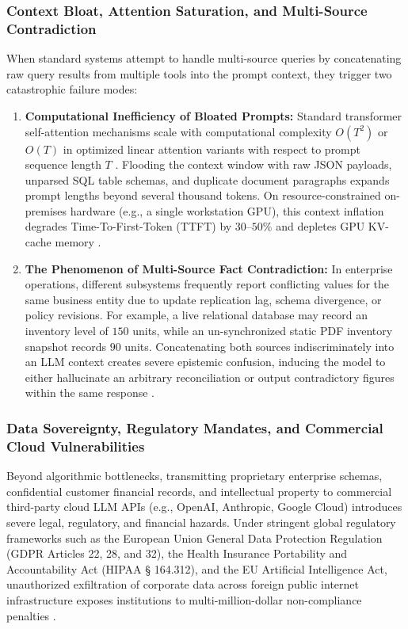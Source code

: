 \documentclass[journal,10pt,twocolumn]{IEEEtran}
\begin{document}
\subsubsection{Context Bloat, Attention Saturation, and Multi-Source Contradiction}
When standard systems attempt to handle multi-source queries by concatenating raw query results from multiple tools into the prompt context, they trigger two catastrophic failure modes:
\begin{enumerate}
    \item \textbf{Computational Inefficiency of Bloated Prompts:} Standard transformer self-attention mechanisms scale with computational complexity $O(T^2)$ or $O(T)$ in optimized linear attention variants with respect to prompt sequence length $T$ \cite{vaswani2017attention,dao2022flashattention}. Flooding the context window with raw JSON payloads, unparsed SQL table schemas, and duplicate document paragraphs expands prompt lengths beyond several thousand tokens. On resource-constrained on-premises hardware (e.g., a single workstation GPU), this context inflation degrades Time-To-First-Token (TTFT) by $30\text{--}50\%$ and depletes GPU KV-cache memory \cite{liu2024lost_in_the_middle}.
    \item \textbf{The Phenomenon of Multi-Source Fact Contradiction:} In enterprise operations, different subsystems frequently report conflicting values for the same business entity due to update replication lag, schema divergence, or policy revisions. For example, a live relational database may record an inventory level of $150$ units, while an un-synchronized static PDF inventory snapshot records $90$ units. Concatenating both sources indiscriminately into an LLM context creates severe epistemic confusion, inducing the model to either hallucinate an arbitrary reconciliation or output contradictory figures within the same response \cite{chen2023frugalgpt,min2023factscore}.
\end{enumerate}

\subsubsection{Data Sovereignty, Regulatory Mandates, and Commercial Cloud Vulnerabilities}
Beyond algorithmic bottlenecks, transmitting proprietary enterprise schemas, confidential customer financial records, and intellectual property to commercial third-party cloud LLM APIs (e.g., OpenAI, Anthropic, Google Cloud) introduces severe legal, regulatory, and financial hazards. Under stringent global regulatory frameworks such as the European Union General Data Protection Regulation (GDPR Articles 22, 28, and 32), the Health Insurance Portability and Accountability Act (HIPAA § 164.312), and the EU Artificial Intelligence Act, unauthorized exfiltration of corporate data across foreign public internet infrastructure exposes institutions to multi-million-dollar non-compliance penalties \cite{voigt2017eu_gdpr}. 
\end{document}
